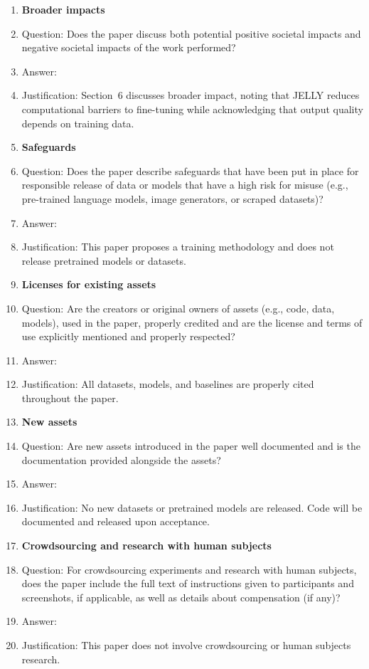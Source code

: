 \begin{enumerate}
\item {\bf Broader impacts}
    \item[] Question: Does the paper discuss both potential positive societal impacts and negative societal impacts of the work performed?
    \item[] Answer: \answerYes{}
    \item[] Justification: Section~6 discusses broader impact, noting that JELLY reduces computational barriers to fine-tuning while acknowledging that output quality depends on training data.

\item {\bf Safeguards}
    \item[] Question: Does the paper describe safeguards that have been put in place for responsible release of data or models that have a high risk for misuse (e.g., pre-trained language models, image generators, or scraped datasets)?
    \item[] Answer: \answerNA{}
    \item[] Justification: This paper proposes a training methodology and does not release pretrained models or datasets.

\item {\bf Licenses for existing assets}
    \item[] Question: Are the creators or original owners of assets (e.g., code, data, models), used in the paper, properly credited and are the license and terms of use explicitly mentioned and properly respected?
    \item[] Answer: \answerYes{}
    \item[] Justification: All datasets, models, and baselines are properly cited throughout the paper.

\item {\bf New assets}
    \item[] Question: Are new assets introduced in the paper well documented and is the documentation provided alongside the assets?
    \item[] Answer: \answerNA{}
    \item[] Justification: No new datasets or pretrained models are released. Code will be documented and released upon acceptance.

\item {\bf Crowdsourcing and research with human subjects}
    \item[] Question: For crowdsourcing experiments and research with human subjects, does the paper include the full text of instructions given to participants and screenshots, if applicable, as well as details about compensation (if any)?
    \item[] Answer: \answerNA{}
    \item[] Justification: This paper does not involve crowdsourcing or human subjects research.


\end{enumerate}
